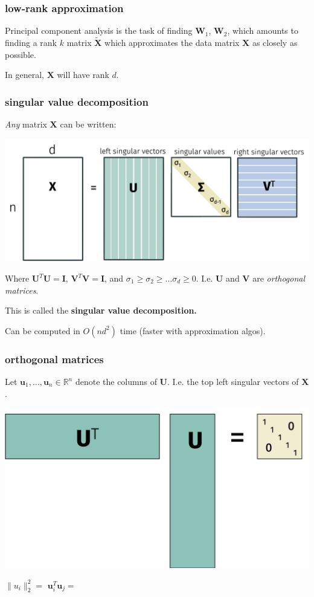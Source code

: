 \documentclass[handout,compress]{beamer}
\newcommand{\bv}[1]{\mathbf{#1}}
\newcommand{\R}{\mathbb{R}}
\begin{document}
\begin{frame}
	\frametitle{low-rank approximation}
	Principal component analysis is the task of finding $\bv{W}_1$, $\bv{W}_2$, which amounts to finding a rank $k$ matrix $\tilde{\bv{X}}$ which approximates the data matrix $\bv{X}$ as closely as possible. 
	
	In general, $\bv{X}$ will have rank $d$. 
\end{frame}

\begin{frame}
	\frametitle{singular value decomposition}
	\small
	\emph{Any} matrix $\bv{X}$ can be written:
	\begin{center}
		\includegraphics[width=.9\textwidth]{svd.png}
	\end{center} 
	Where $\bv{U}^T\bv{U} = \bv{I}$,  $\bv{V}^T\bv{V} = \bv{I}$, and $\sigma_1 \geq \sigma_2 \geq \ldots \sigma_d \geq 0$. I.e. $\bv{U}$ and $\bv{V}$ are \emph{orthogonal matrices}.
	\begin{center}
		\normalsize This is called the \textbf{singular value decomposition.}
	\end{center}
Can be computed in $O(nd^2)$ time (faster with approximation algos).
\end{frame}

\begin{frame}
	\frametitle{orthogonal matrices}
	Let $\bv{u}_1, \ldots, \bv{u}_n \in \R^n$ denote the columns of $\bv{U}$. I.e. the top left singular vectors of $\bv{X}$. 
		\begin{center}
		\includegraphics[width=.5\textwidth]{orthogonal.png}
	\end{center}
\begin{center}
	$\|u_i\|_2^2 = $ \hspace{8em} $\bv{u}_i^T\bv{u}_j = $
\end{center}
	
\end{frame}
\end{document}
